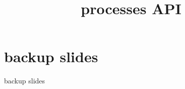 \graphicspath{{./figures/}}
\title{processes API}
\date{}

\begin{frame}
    \titlepage
\end{frame}





\section{backup slides}
\begin{frame}{backup slides}
\end{frame}




